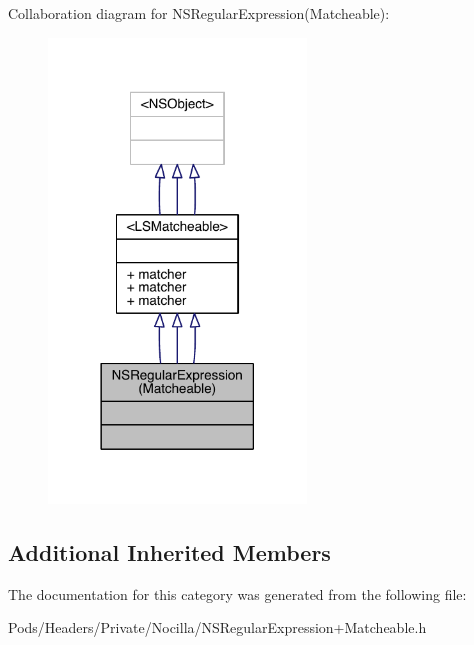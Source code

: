 Collaboration diagram for N\-S\-Regular\-Expression(Matcheable)\-:\nopagebreak
\begin{figure}[H]
\begin{center}
\leavevmode
\includegraphics[width=194pt]{category_n_s_regular_expression_07_matcheable_08__coll__graph}
\end{center}
\end{figure}
\subsection*{Additional Inherited Members}


The documentation for this category was generated from the following file\-:\begin{DoxyCompactItemize}
\item 
Pods/\-Headers/\-Private/\-Nocilla/N\-S\-Regular\-Expression+\-Matcheable.\-h\end{DoxyCompactItemize}
